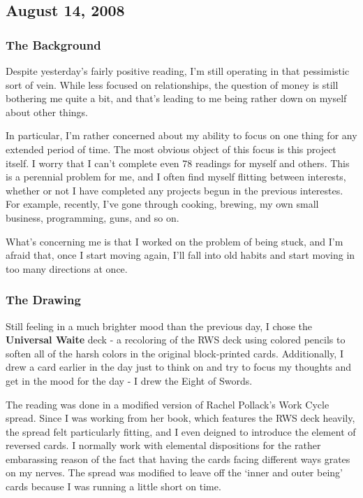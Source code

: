 \subsection{August 14, 2008}
\subsubsection*{The Background}
Despite yesterday's fairly positive reading, I'm still operating in that
pessimistic sort of vein.  While less focused on relationships, the
question of money is still bothering me quite a bit, and that's leading
to me being rather down on myself about other things.

In particular, I'm rather concerned about my ability to focus on one
thing for any extended period of time.  The most obvious object of this
focus is this project itself.  I worry that I can't complete even 78
readings for myself and others.  This is a perennial problem for me, and
I often find myself flitting between interests, whether or not I have
completed any projects begun in the previous interestes.  For example,
recently, I've gone through cooking, brewing, my own small business,
programming, guns, and so on.

What's concerning me is that I worked on the problem of being stuck, and
I'm afraid that, once I start moving again, I'll fall into old habits and
start moving in too many directions at once.

\subsubsection*{The Drawing}
Still feeling in a much brighter mood than the previous day, I chose the
\textbf{Universal Waite}\cite{tarotRWS} deck - a recoloring of the RWS deck using colored
pencils to soften all of the harsh colors in the original block-printed
cards.  Additionally, I drew a card earlier in the day just to think on
and try to focus my thoughts and get in the mood for the day - I drew
the Eight of Swords.

The reading was done in a modified version of Rachel Pollack's Work Cycle
spread\cite{pollack97}.  Since I was working from her book, which
features the RWS deck heavily, the spread felt particularly fitting, and
I even deigned to introduce the element of reversed cards.  I normally
work with elemental dispositions for the rather embarassing reason of
the fact that having the cards facing different ways grates on my
nerves.  The spread was modified to leave off the `inner and outer
being' cards because I was running a little short on time.

